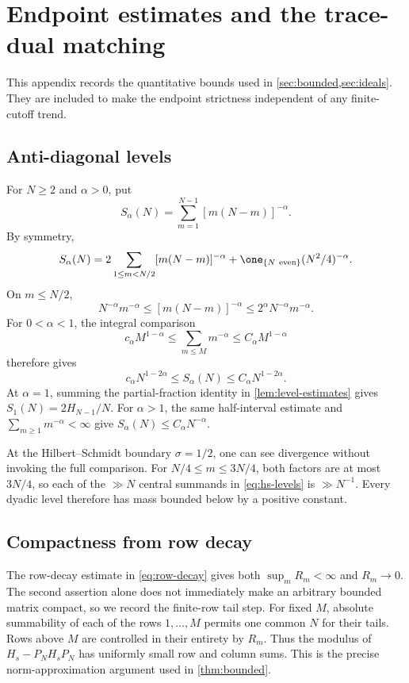 \section{Endpoint estimates and the trace-dual matching}
\label{app:endpoints}

This appendix records the quantitative bounds used in
\cref{sec:bounded,sec:ideals}.  They are included to make the endpoint
strictness independent of any finite-cutoff trend.

\subsection{Anti-diagonal levels}

For $N\ge2$ and $\alpha>0$, put
\[
  S_\alpha(N)=\sum_{m=1}^{N-1}[m(N-m)]^{-\alpha}.
\]
By symmetry,
\[
  S_\alpha(N)
  =2\sum_{1\le m<N/2}[m(N-m)]^{-\alpha}
   +\one_{\{N\ {\rm even}\}}(N^2/4)^{-\alpha}.
\]
On $m\le N/2$,
\[
  N^{-\alpha}m^{-\alpha}
  \le [m(N-m)]^{-\alpha}
  \le 2^\alpha N^{-\alpha}m^{-\alpha}.
\]
For $0<\alpha<1$, the integral comparison
\[
  c_\alpha M^{1-\alpha}
  \le\sum_{m\le M}m^{-\alpha}
  \le C_\alpha M^{1-\alpha}
\]
therefore gives
\[
  c_\alpha N^{1-2\alpha}
  \le S_\alpha(N)
  \le C_\alpha N^{1-2\alpha}.
\]
At $\alpha=1$, summing the partial-fraction identity in
\cref{lem:level-estimates} gives
$S_1(N)=2H_{N-1}/N$.  For $\alpha>1$, the same half-interval estimate and
$\sum_{m\ge1}m^{-\alpha}<\infty$ give
$S_\alpha(N)\le C_\alpha N^{-\alpha}$.

At the Hilbert--Schmidt boundary $\sigma=1/2$, one can see divergence
without invoking the full comparison.  For
$N/4\le m\le3N/4$, both factors are at most $3N/4$, so each of the
$\gg N$ central summands in \cref{eq:hs-levels} is $\gg N^{-1}$.
Every dyadic level therefore has mass bounded below by a positive constant.

\subsection{Compactness from row decay}

The row-decay estimate in \cref{eq:row-decay} gives both
$\sup_mR_m<\infty$ and $R_m\to0$.  The second assertion alone does not
immediately make an arbitrary bounded matrix compact, so we record the
finite-row tail step.  For fixed $M$, absolute summability of each of the
rows $1,\ldots,M$ permits one common $N$ for their tails.  Rows above $M$
are controlled in their entirety by $R_m$.  Thus the modulus of
$H_s-P_NH_sP_N$ has uniformly small row and column sums.  This is the
precise norm-approximation argument used in \cref{thm:bounded}.

